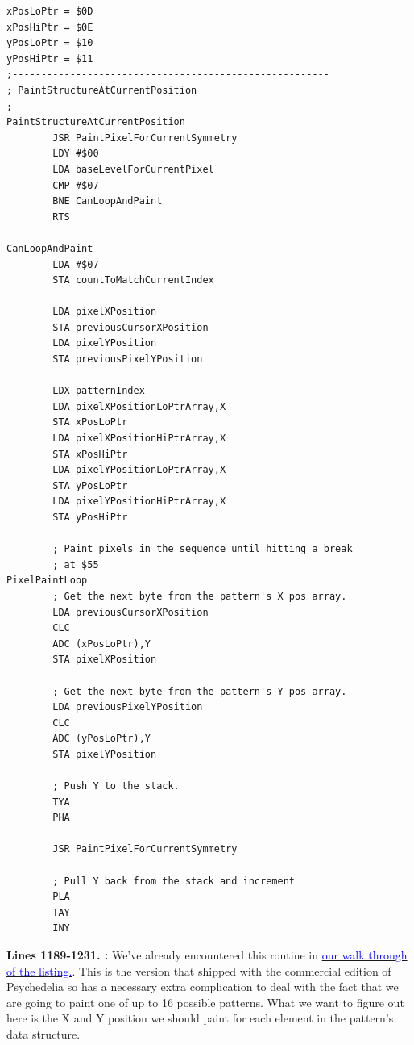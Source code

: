 \clearpage
\begin{lstlisting}[basicstyle=\ttfamily\scriptsize, caption=The routine responsible for painting patterns.]
xPosLoPtr = $0D
xPosHiPtr = $0E
yPosLoPtr = $10
yPosHiPtr = $11
;-------------------------------------------------------
; PaintStructureAtCurrentPosition
;-------------------------------------------------------
PaintStructureAtCurrentPosition   
        JSR PaintPixelForCurrentSymmetry
        LDY #$00
        LDA baseLevelForCurrentPixel
        CMP #$07
        BNE CanLoopAndPaint
        RTS 

CanLoopAndPaint   
        LDA #$07
        STA countToMatchCurrentIndex

        LDA pixelXPosition
        STA previousCursorXPosition
        LDA pixelYPosition
        STA previousPixelYPosition

        LDX patternIndex
        LDA pixelXPositionLoPtrArray,X
        STA xPosLoPtr
        LDA pixelXPositionHiPtrArray,X
        STA xPosHiPtr
        LDA pixelYPositionLoPtrArray,X
        STA yPosLoPtr
        LDA pixelYPositionHiPtrArray,X
        STA yPosHiPtr

        ; Paint pixels in the sequence until hitting a break
        ; at $55
PixelPaintLoop   
        ; Get the next byte from the pattern's X pos array.
        LDA previousCursorXPosition
        CLC 
        ADC (xPosLoPtr),Y
        STA pixelXPosition

        ; Get the next byte from the pattern's Y pos array.
        LDA previousPixelYPosition
        CLC 
        ADC (yPosLoPtr),Y
        STA pixelYPosition

        ; Push Y to the stack.
        TYA 
        PHA 

        JSR PaintPixelForCurrentSymmetry

        ; Pull Y back from the stack and increment
        PLA 
        TAY 
        INY 
\end{lstlisting}
\clearpage

\textbf{Lines 1189-1231. :} We've already encountered this routine
in \hyperref[sec:listing_commentary]{\textcolor{blue}{ our walk through of the listing.}}. This is the version that shipped 
with the commercial edition of Psychedelia so has a necessary extra complication to deal with the fact that we 
are going to paint one of up to 16 possible patterns. What we want to figure out here is the X and Y position we should
paint for each element in the pattern's data structure.

